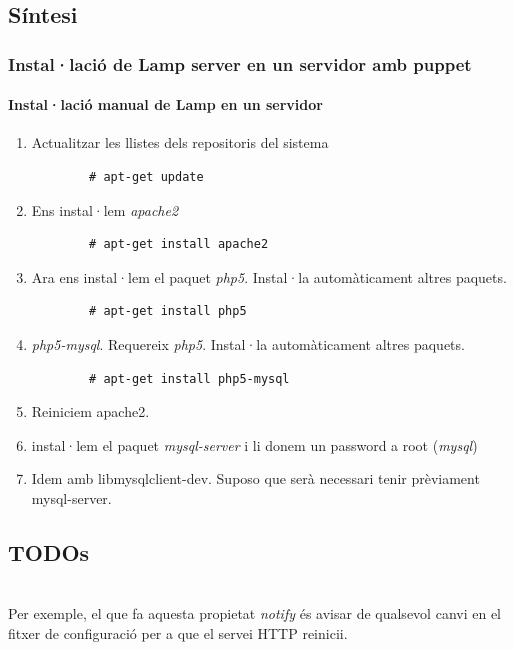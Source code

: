 \documentclass[a4paper]{article}
\begin{document}
\subsection{Síntesi}
\subsubsection{Instal·lació de Lamp server en un servidor amb puppet}
\paragraph{Instal·lació manual de Lamp en un servidor \\}
\begin{enumerate}
	\item Actualitzar les llistes dels repositoris del sistema
		\begin{verbatim}
		# apt-get update
		\end{verbatim}
	\item Ens instal·lem \textit{apache2}
		\begin{verbatim}
		# apt-get install apache2
		\end{verbatim}
	\item Ara ens instal·lem el paquet \textit{php5}. Instal·la automàticament altres paquets.
		\begin{verbatim}
		# apt-get install php5
		\end{verbatim}
	\item \textit{php5-mysql}. Requereix \textit{php5}. Instal·la automàticament altres paquets.
		\begin{verbatim}
		# apt-get install php5-mysql
		\end{verbatim}
	\item Reiniciem apache2. 
	\item instal·lem el paquet \textit{mysql-server} i li donem un password a root (\textit{mysql})
	\item Idem amb libmysqlclient-dev. Suposo que serà necessari tenir prèviament mysql-server. %
\end{enumerate}


\subsection{TODOs}
\\
Per exemple, el que fa aquesta propietat \textit{notify} \'es avisar de qualsevol canvi en el fitxer de configuració per a que el servei HTTP reinicii.
\end{document}
